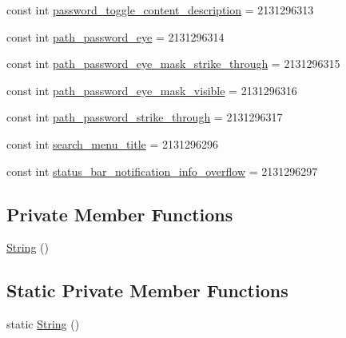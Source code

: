 \begin{DoxyCompactItemize}
\item 
const int \mbox{\hyperlink{class_f_w_p_s___app_1_1_droid_1_1_resource_1_1_string_a7f322e627b73f484ec48b20099b8c63b}{password\+\_\+toggle\+\_\+content\+\_\+description}} = 2131296313
\item 
const int \mbox{\hyperlink{class_f_w_p_s___app_1_1_droid_1_1_resource_1_1_string_a4f8f83de1e8b099c3308432d3359dbb2}{path\+\_\+password\+\_\+eye}} = 2131296314
\item 
const int \mbox{\hyperlink{class_f_w_p_s___app_1_1_droid_1_1_resource_1_1_string_a02eb40bfaea07a8b67ccf30ef627c173}{path\+\_\+password\+\_\+eye\+\_\+mask\+\_\+strike\+\_\+through}} = 2131296315
\item 
const int \mbox{\hyperlink{class_f_w_p_s___app_1_1_droid_1_1_resource_1_1_string_a204510f7e4f2e566df5b6bc4a7afd3a0}{path\+\_\+password\+\_\+eye\+\_\+mask\+\_\+visible}} = 2131296316
\item 
const int \mbox{\hyperlink{class_f_w_p_s___app_1_1_droid_1_1_resource_1_1_string_ad03b1b5a173bd991de12ab036dc23889}{path\+\_\+password\+\_\+strike\+\_\+through}} = 2131296317
\item 
const int \mbox{\hyperlink{class_f_w_p_s___app_1_1_droid_1_1_resource_1_1_string_a8f2efb4eb47b960e4292b12660d0ab32}{search\+\_\+menu\+\_\+title}} = 2131296296
\item 
const int \mbox{\hyperlink{class_f_w_p_s___app_1_1_droid_1_1_resource_1_1_string_afce9caf108da59e54bfb239acf565489}{status\+\_\+bar\+\_\+notification\+\_\+info\+\_\+overflow}} = 2131296297
\end{DoxyCompactItemize}
\subsection*{Private Member Functions}
\begin{DoxyCompactItemize}
\item 
\mbox{\hyperlink{class_f_w_p_s___app_1_1_droid_1_1_resource_1_1_string_a3ff8168f843ebf5d1857f447228ab34f}{String}} ()
\end{DoxyCompactItemize}
\subsection*{Static Private Member Functions}
\begin{DoxyCompactItemize}
\item 
static \mbox{\hyperlink{class_f_w_p_s___app_1_1_droid_1_1_resource_1_1_string_a44de42b1e189a9beebe22b66621d4651}{String}} ()
\end{DoxyCompactItemize}


